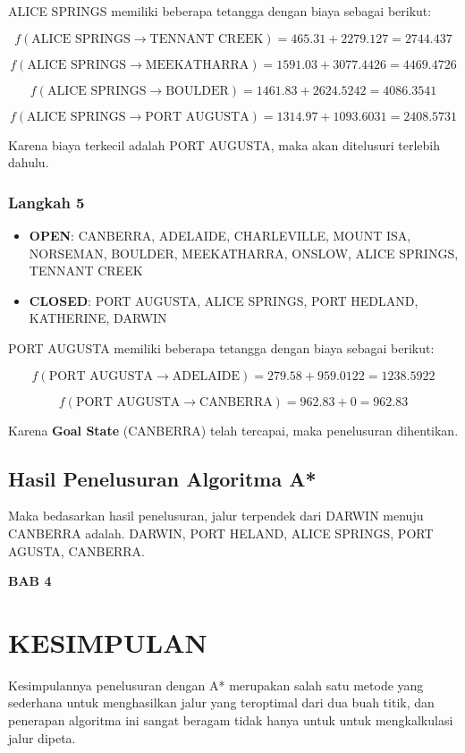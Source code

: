 \documentclass[12pt,a4paper]{article}
\begin{document}
ALICE SPRINGS memiliki beberapa tetangga dengan biaya sebagai berikut:

\[
f(\text{ALICE SPRINGS} \to \text{TENNANT CREEK}) = 465.31 + 2279.127 = 2744.437
\]

\[
f(\text{ALICE SPRINGS} \to \text{MEEKATHARRA}) = 1591.03 + 3077.4426 = 4469.4726
\]

\[
f(\text{ALICE SPRINGS} \to \text{BOULDER}) = 1461.83 + 2624.5242 = 4086.3541
\]

\[
f(\text{ALICE SPRINGS} \to \text{PORT AUGUSTA}) = 1314.97 + 1093.6031 = 2408.5731
\]

Karena biaya terkecil adalah PORT AUGUSTA, maka akan ditelusuri terlebih dahulu.  

\subsubsection*{Langkah 5}

\begin{itemize}
    \item \textbf{OPEN}: CANBERRA, ADELAIDE, CHARLEVILLE, MOUNT ISA, NORSEMAN, BOULDER, MEEKATHARRA, ONSLOW, ALICE SPRINGS, TENNANT CREEK
    \item \textbf{CLOSED}: PORT AUGUSTA, ALICE SPRINGS, PORT HEDLAND, KATHERINE, DARWIN
\end{itemize}

PORT AUGUSTA memiliki beberapa tetangga dengan biaya sebagai berikut:

\[
f(\text{PORT AUGUSTA} \to \text{ADELAIDE}) = 279.58 + 959.0122 = 1238.5922
\]

\[
f(\text{PORT AUGUSTA} \to \text{CANBERRA}) = 962.83 + 0 = 962.83
\]

Karena \textbf{Goal State} (CANBERRA) telah tercapai, maka penelusuran dihentikan.  

\subsection{Hasil Penelusuran Algoritma A*}

Maka bedasarkan hasil penelusuran, jalur terpendek dari DARWIN menuju CANBERRA adalah.
DARWIN,  PORT HELAND, ALICE SPRINGS, PORT AGUSTA, CANBERRA.

\newpage

\begin{center}
  \large{\textbf{BAB 4}}

  \section*{KESIMPULAN}
\end{center}
\vspace{1cm}

Kesimpulannya penelusuran dengan A* merupakan salah satu metode yang sederhana
untuk menghasilkan jalur yang teroptimal dari dua buah titik, dan penerapan
algoritma ini sangat beragam tidak hanya untuk untuk mengkalkulasi jalur dipeta.
\end{document}
